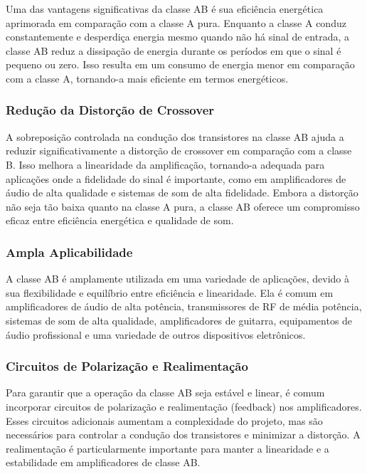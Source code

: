 Uma das vantagens significativas da classe AB é sua eficiência energética aprimorada em comparação com a classe A pura. Enquanto a classe A conduz constantemente e desperdiça energia mesmo quando não há sinal de entrada, a classe AB reduz a dissipação de energia durante os períodos em que o sinal é pequeno ou zero. Isso resulta em um consumo de energia menor em comparação com a classe A, tornando-a mais eficiente em termos energéticos.

\subsubsection{Redução da Distorção de Crossover}

A sobreposição controlada na condução dos transistores na classe AB ajuda a reduzir significativamente a distorção de crossover em comparação com a classe B. Isso melhora a linearidade da amplificação, tornando-a adequada para aplicações onde a fidelidade do sinal é importante, como em amplificadores de áudio de alta qualidade e sistemas de som de alta fidelidade. Embora a distorção não seja tão baixa quanto na classe A pura, a classe AB oferece um compromisso eficaz entre eficiência energética e qualidade de som.

\subsubsection{Ampla Aplicabilidade}

A classe AB é amplamente utilizada em uma variedade de aplicações, devido à sua flexibilidade e equilíbrio entre eficiência e linearidade. Ela é comum em amplificadores de áudio de alta potência, transmissores de RF de média potência, sistemas de som de alta qualidade, amplificadores de guitarra, equipamentos de áudio profissional e uma variedade de outros dispositivos eletrônicos.

\subsubsection{Circuitos de Polarização e Realimentação}

Para garantir que a operação da classe AB seja estável e linear, é comum incorporar circuitos de polarização e realimentação (feedback) nos amplificadores. Esses circuitos adicionais aumentam a complexidade do projeto, mas são necessários para controlar a condução dos transistores e minimizar a distorção. A realimentação é particularmente importante para manter a linearidade e a estabilidade em amplificadores de classe AB.

